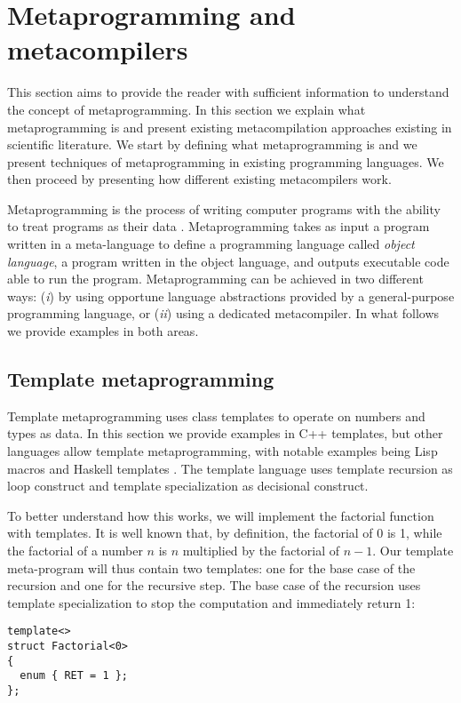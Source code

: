 \section{Metaprogramming and metacompilers}
\label{sec:ch_background_metaprogramming}
This section aims to provide the reader with sufficient information to understand the concept of metaprogramming. In this section we explain what metaprogramming is and present existing metacompilation approaches existing in scientific literature. We start by defining what metaprogramming is and we present techniques of metaprogramming in existing programming languages. We then proceed by presenting how different existing metacompilers work.

Metaprogramming is the process of writing computer programs with the ability to treat programs as their data \cite{czarnecki2000generative}. Metaprogramming takes as input a program written in a meta-language to define a programming language called \textit{object language}, a program written in the object language, and outputs executable code able to run the program. Metaprogramming can be achieved in two different ways: (\textit{i}) by using opportune language abstractions provided by a general-purpose programming language, or (\textit{ii}) using a dedicated metacompiler. In what follows we provide examples in both areas.

\subsection{Template metaprogramming}
Template metaprogramming uses class templates to operate on numbers and types as data. In this section we provide examples in C++ templates, but other languages allow template metaprogramming, with notable examples being Lisp macros and Haskell templates \cite{sheard2002template}. The template language uses template recursion as loop construct and template specialization as decisional construct.

To better understand how this works, we will implement the factorial function with templates. It is well known that, by definition, the factorial of 0 is 1, while the factorial of a number $n$ is $n$ multiplied by the factorial of $n - 1$. Our template meta-program will thus contain two templates: one for the base case of the recursion and one for the recursive step. The base case of the recursion uses template specialization to stop the computation and immediately return 1:

\begin{lstlisting}
template<>
struct Factorial<0>
{
  enum { RET = 1 };
};
\end{lstlisting}

